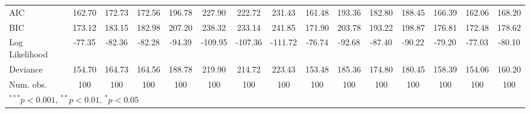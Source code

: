 \begin{table}
\begin{center}
\begin{tabular}{l c c c c c c c c c c c c c c }
\hline
AIC                                                       & 162.70        & 172.73       & 172.56       & 196.78       & 227.90       & 222.72       & 231.43       & 161.48        & 193.36        & 182.80        & 188.45        & 166.39        & 162.06        & 168.20        \\
BIC                                                       & 173.12        & 183.15       & 182.98       & 207.20       & 238.32       & 233.14       & 241.85       & 171.90        & 203.78        & 193.22        & 198.87        & 176.81        & 172.48        & 178.62        \\
Log Likelihood                                            & -77.35        & -82.36       & -82.28       & -94.39       & -109.95      & -107.36      & -111.72      & -76.74        & -92.68        & -87.40        & -90.22        & -79.20        & -77.03        & -80.10        \\
Deviance                                                  & 154.70        & 164.73       & 164.56       & 188.78       & 219.90       & 214.72       & 223.43       & 153.48        & 185.36        & 174.80        & 180.45        & 158.39        & 154.06        & 160.20        \\
Num. obs.                                                 & 100           & 100          & 100          & 100          & 100          & 100          & 100          & 100           & 100           & 100           & 100           & 100           & 100           & 100           \\
\hline
\multicolumn{15}{l}{\scriptsize{$^{***}p<0.001$, $^{**}p<0.01$, $^*p<0.05$}}
\end{tabular}
\label{table:coefficients}
\end{center}
\end{table}


